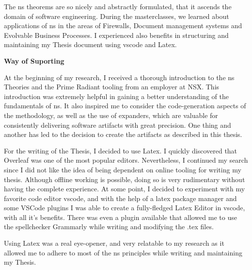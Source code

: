 The \gls{ns} theorems are so nicely and abstractly formulated, that it ascends the domain
of software engineering. During the masterclasses, we learned about applications of
\gls{ns} in the areas of Firewalls, Document management systems and Evolvable Business
Processes. I experienced also benefits in structuring and maintaining my Thesis document
using \gls{vscode} and Latex. 

\textbf{Way of Suporting}

At the beginning of my research, I received a thorough introduction to the \gls{ns}
Theories and the Prime Radiant tooling from an employer at NSX. This introduction was
extremely helpful in gaining a better understanding of the fundamentals of \gls{ns}. It
also inspired me to consider the code-generation aspects of the methodology, as well as
the use of expanders, which are valuable for consistently delivering software artifacts
with great precision. One thing and another has led to the decision to create the
artifacts as described in this thesis.

For the writing of the Thesis, I decided to use Latex. I quickly discovered that Overleaf
was one of the most popular editors. Nevertheless, I continued my search since I did not
like the idea of being dependent on online tooling for writing my thesis. Although offline
working is possible, doing so is very rudimentary without having the complete experience. At
some point, I decided to experiment with my favorite code editor \gls{vscode}, and
with the help of a latex package manager and some VSCode plugins I was able to create
a fully-fledged Latex Editor in \gls{vscode}, with all it's benefits. There was even a
plugin available that allowed me to use the spellchecker Grammarly while writing and
modifying the .tex files.

Using Latex was a real eye-opener, and very relatable to my research as it allowed me to
adhere to most of the \gls{ns} principles while writing and maintaining my Thesis.
